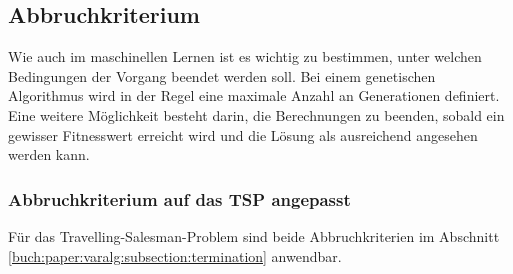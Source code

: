 %
%
%
%
\subsection{Abbruchkriterium
\label{buch:paper:varalg:subsection:termination}}
%
Wie auch im maschinellen Lernen ist es wichtig zu bestimmen, unter 
welchen Bedingungen der Vorgang beendet werden soll. Bei einem 
genetischen Algorithmus wird in der Regel eine maximale Anzahl an 
Generationen definiert. Eine weitere Möglichkeit besteht darin, 
die Berechnungen zu beenden, sobald ein gewisser Fitnesswert erreicht 
wird und die Lösung als ausreichend angesehen werden kann.

\subsubsection{Abbruchkriterium auf das TSP angepasst
\label{buch:paper:varalg:subsection:termination_tsp}}
Für das Travelling-Salesman-Problem sind beide Abbruchkriterien im 
Abschnitt \ref{buch:paper:varalg:subsection:termination} anwendbar.
